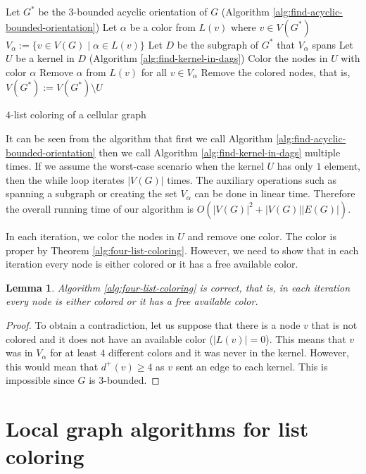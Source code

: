 \documentclass[a4paper, 12pt]{article}
\newtheorem{lem}{Lemma}[section]
\begin{document}
\begin{algorithm}\label{alg:four-list-coloring}
  Let $G^*$ be the $3$-bounded acyclic orientation of $G$ (Algorithm \ref{alg:find-acyclic-bounded-orientation})\;
   {
  	Let $\alpha$ be a color from $L(v)$ where $v \in V(G^*)$\;
  	$V_\alpha := \lbrace v \in V(G) \mid \alpha \in L(v) \rbrace$\;
  	Let $D$ be the subgraph of $G^*$ that $V_\alpha$ spans\;
  	Let $U$ be a kernel in $D$ (Algorithm \ref{alg:find-kernel-in-dags})\;
  	Color the nodes in $U$ with color $\alpha$\;
  	Remove $\alpha$ from $L(v)$ for all $v \in V_\alpha$\;
  	Remove the colored nodes, that is, $V(G^*) := V(G^*) \setminus U$\;
  }
 \caption{$4$-list coloring of a cellular graph}
\end{algorithm}

It can be seen from the algorithm that first we call Algorithm \ref{alg:find-acyclic-bounded-orientation} then we call Algorithm \ref{alg:find-kernel-in-dags} multiple times. If we assume the worst-case scenario when the kernel $U$ has only $1$ element, then the while loop iterates $|V(G)|$ times. The auxiliary operations such as spanning a subgraph or creating the set $V_\alpha$ can be done in linear time. Therefore the overall running time of our algorithm is $O(|V(G)|^2+|V(G)||E(G)|)$.

In each iteration, we color the nodes in $U$ and remove one color. The color is proper by Theorem \ref{alg:four-list-coloring}. However, we need to show that in each iteration every node is either colored or it has a free available color.
\begin{lem} Algorithm \ref{alg:four-list-coloring} is correct, that is, in each iteration every node is either colored or it has a free available color.
\end{lem}
\begin{proof} To obtain a contradiction, let us suppose that there is a node $v$ that is not colored and it does not have an available color ($|L(v)|=0$). This means that $v$ was in $V_{\alpha}$ for at least $4$ different colors and it was never in the kernel. However, this would mean that $d^+(v) \geqslant 4$ as $v$ sent an edge to each kernel. This is impossible since $G$ is $3$-bounded.
\end{proof}

\section{Local graph algorithms for list coloring}

\newpage
\printbibliography
{}
\end{document}
